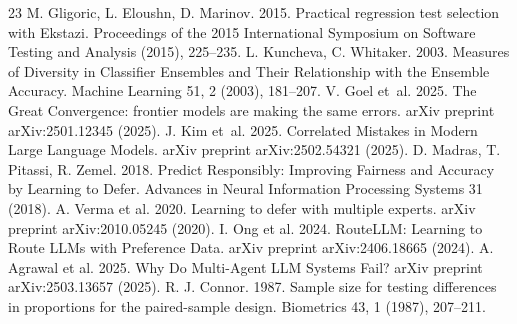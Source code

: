 \documentclass[manuscript,screen,nonacm]{acmart}
\begin{document}
\begin{thebibliography}{23}
 M. Gligoric, L. Eloushn, D. Marinov. 2015. Practical regression test selection with Ekstazi. Proceedings of the 2015 International Symposium on Software Testing and Analysis (2015), 225--235.
 L. Kuncheva, C. Whitaker. 2003. Measures of Diversity in Classifier Ensembles and Their Relationship with the Ensemble Accuracy. Machine Learning 51, 2 (2003), 181--207.
 V. Goel et~al. 2025. The Great Convergence: frontier models are making the same errors. arXiv preprint arXiv:2501.12345 (2025).
 J. Kim et~al. 2025. Correlated Mistakes in Modern Large Language Models. arXiv preprint arXiv:2502.54321 (2025).
 D. Madras, T. Pitassi, R. Zemel. 2018. Predict Responsibly: Improving Fairness and Accuracy by Learning to Defer. Advances in Neural Information Processing Systems 31 (2018).
 A. Verma et al. 2020. Learning to defer with multiple experts. arXiv preprint arXiv:2010.05245 (2020).
 I. Ong et al. 2024. RouteLLM: Learning to Route LLMs with Preference Data. arXiv preprint arXiv:2406.18665 (2024).
 A. Agrawal et al. 2025. Why Do Multi-Agent LLM Systems Fail? arXiv preprint arXiv:2503.13657 (2025).
 R. J. Connor. 1987. Sample size for testing differences in proportions for the paired-sample design. Biometrics 43, 1 (1987), 207--211.
\end{thebibliography}
\end{document}
